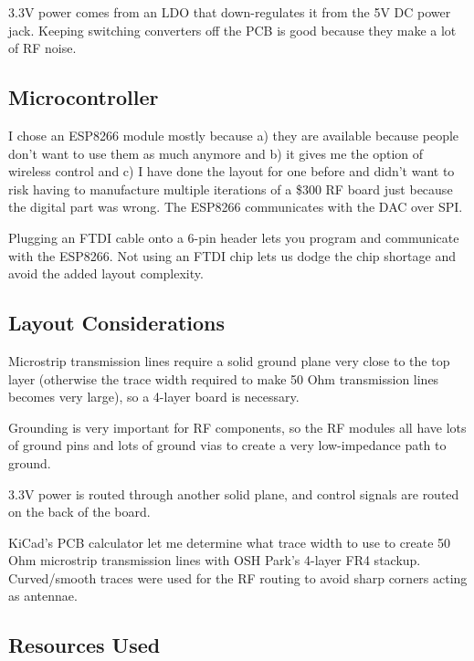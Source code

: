 \documentclass[fleqn]{article}
\begin{document}
3.3V power comes from an LDO that down-regulates it from the 5V DC power jack. Keeping switching converters off the PCB is good because they make a lot of RF noise.

\subsection{Microcontroller}

I chose an ESP8266 module mostly because a) they are available because people don't want to use them as much anymore and b) it gives me the option of wireless control and c) I have done the layout for one before and didn't want to risk having to manufacture multiple iterations of a \$300 RF board just because the digital part was wrong. The ESP8266 communicates with the DAC over SPI.

Plugging an FTDI cable onto a 6-pin header lets you program and communicate with the ESP8266. Not using an FTDI chip lets us dodge the chip shortage and avoid the added layout complexity.

\subsection{Layout Considerations}

Microstrip transmission lines require a solid ground plane very close to the top layer (otherwise the trace width required to make 50 Ohm transmission lines becomes very large), so a 4-layer board is necessary.

Grounding is very important for RF components, so the RF modules all have lots of ground pins and lots of ground vias to create a very low-impedance path to ground.

3.3V power is routed through another solid plane, and control signals are routed on the back of the board.

KiCad's PCB calculator let me determine what trace width to use to create 50 Ohm microstrip transmission lines with OSH Park's 4-layer FR4 stackup. Curved/smooth traces were used for the RF routing to avoid sharp corners acting as antennae.

\newpage

\subsection{Resources Used}
\end{document}
